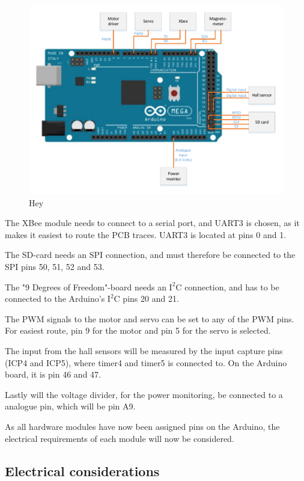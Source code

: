 \begin{figure}[H]
	\centering
	\includegraphics[scale=0.75]{figures/MegaSetup.pdf}
	\caption{Hey}
	\label{MegaSetup}
\end{figure}

The XBee module needs to connect to a serial port, and UART3 is chosen, as it makes it easiest to route the PCB traces. UART3 is located at pins 0 and 1. 

The SD-card needs an SPI connection, and must therefore be connected to the SPI pins 50, 51, 52 and 53. 

The "9 Degrees of Freedom"-board needs an $\text{I}^2\text{C}$ connection, and has to be connected to the Arduino's $\text{I}^2\text{C}$ pins 20 and 21. 

The PWM signals to the motor and servo can be set to any of the PWM pins. For easiest route, pin 9 for the motor and pin 5 for the servo is selected.

The input from the hall sensors will be measured by the input capture pins (ICP4 and ICP5), where timer4 and timer5 is connected to. On the Arduino board, it is pin 46 and 47.

Lastly will the voltage divider, for the power monitoring, be connected to a analogue pin, which will be pin A9.


As all hardware modules have now been assigned pins on the Arduino, the electrical requirements of each module will now be considered.

\subsection{Electrical considerations}

